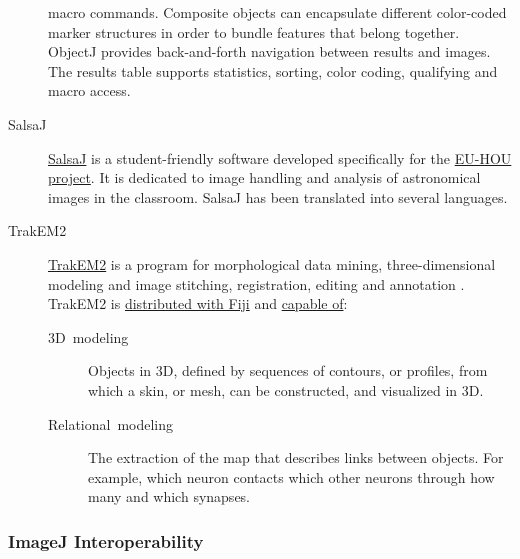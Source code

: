 \begin{description}
macro commands. Composite objects can encapsulate different color-coded
marker structures in order to bundle features that belong together.
ObjectJ provides back-and-forth navigation between results and images.
The results table supports statistics, sorting, color coding, qualifying
and macro access.
\item [{SalsaJ}] \href{http://www.euhou.net/index.php?option=com_content&task=view&id=7&Itemid=9}{SalsaJ}
is a student-friendly software developed specifically for the \href{http://www.euhou.net/}{EU-HOU project}.
It is dedicated to image handling and analysis of astronomical images
in the classroom. SalsaJ has been translated into several
languages.
\item [{\label{misc:TrakEM2}TrakEM2}] \href{http://www.ini.uzh.ch/~acardona/trakem2.html}{TrakEM2}
is a program for morphological data
mining, three-dimensional modeling
and image stitching, registration, editing and annotation \cite{Cardona:2010p18306}.
TrakEM2 is \href{http://fiji.sc/wiki/index.php/TrakEM2}{distributed with Fiji}
and \href{http://www.ini.uzh.ch/~acardona/trakem2_manual.html}{capable of}:\vspace{-8pt}


\begin{description}
\item [{3D\ modeling}] Objects in 3D, defined by sequences of contours,
or profiles, from which a skin, or mesh, can be constructed, and visualized
in 3D.
\item [{Relational\ modeling}] The extraction of the map that describes
links between objects. For example, which neuron contacts which other
neurons through how many and which synapses. 
\end{description}
\end{description}



\subsubsection{ImageJ Interoperability\label{sec:ImageJ-Interoperability}}

